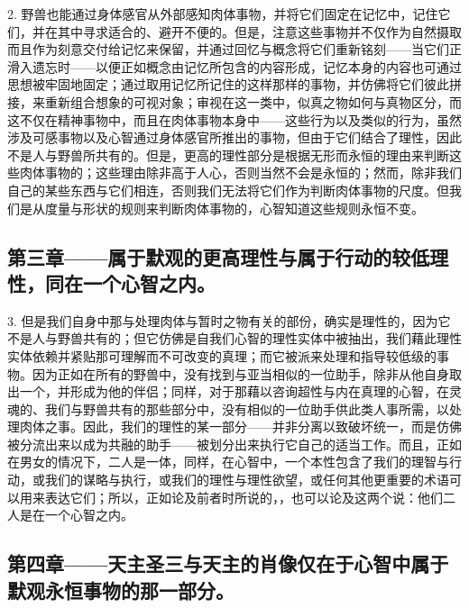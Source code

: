 2. 野兽也能通过身体感官从外部感知肉体事物，并将它们固定在记忆中，记住它们，并在其中寻求适合的、避开不便的。但是，注意这些事物并不仅作为自然摄取而且作为刻意交付给记忆来保留，并通过回忆与概念将它们重新铭刻——当它们正滑入遗忘时——以便正如概念由记忆所包含的内容形成，记忆本身的内容也可通过思想被牢固地固定；通过取用记忆所记住的这样那样的事物，并仿佛将它们彼此拼接，来重新组合想象的可视对象；审视在这一类中，似真之物如何与真物区分，而这不仅在精神事物中，而且在肉体事物本身中——这些行为以及类似的行为，虽然涉及可感事物以及心智通过身体感官所推出的事物，但由于它们结合了理性，因此不是人与野兽所共有的。但是，更高的理性部分是根据无形而永恒的理由来判断这些肉体事物的；这些理由除非高于人心，否则当然不会是永恒的；然而，除非我们自己的某些东西与它们相连，否则我们无法将它们作为判断肉体事物的尺度。但我们是从度量与形状的规则来判断肉体事物的，心智知道这些规则永恒不变。\par


\subsection{第三章——属于默观的更高理性与属于行动的较低理性，同在一个心智之内。}

3. 但是我们自身中那与处理肉体与暂时之物有关的部份，确实是理性的，因为它不是人与野兽共有的；但它仿佛是自我们心智的理性实体中被抽出，我们藉此理性实体依赖并紧贴那可理解而不可改变的真理；而它被派来处理和指导较低级的事物。因为正如在所有的野兽中，没有找到与亚当相似的一位助手，除非从他自身取出一个，并形成为他的伴侣；同样，对于那藉以咨询超性与内在真理的心智，在灵魂的、我们与野兽共有的那些部分中，没有相似的一位助手供此类人事所需，以处理肉体之事。因此，我们的理性的某一部分——并非分离以致破坏统一，而是仿佛被分流出来以成为共融的助手——被划分出来执行它自己的适当工作。而且，正如在男女的情况下，二人是一体，同样，在心智中，一个本性包含了我们的理智与行动，或我们的谋略与执行，或我们的理性与理性欲望，或任何其他更重要的术语可以用来表达它们；所以，正如论及前者时所说的，，也可以论及这两个说：他们二人是在一个心智之内。\par


\subsection{第四章——天主圣三与天主的肖像仅在于心智中属于默观永恒事物的那一部分。}

